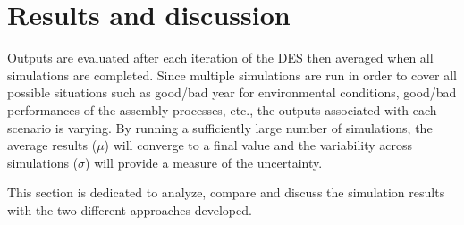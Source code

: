 \section{Results and discussion}
\label{results}
Outputs are evaluated after each iteration of the DES then averaged when all simulations are completed. Since multiple simulations are run in order to cover all possible situations such as good/bad year for environmental conditions, good/bad performances of the assembly processes, etc., the outputs associated with each scenario is varying. By running a sufficiently large number of simulations, the average results ($\mu$) will converge to a final value and the variability across simulations ($\sigma$) will provide a measure of the uncertainty.

This section is dedicated to analyze, compare and discuss the simulation results with the two different approaches developed.